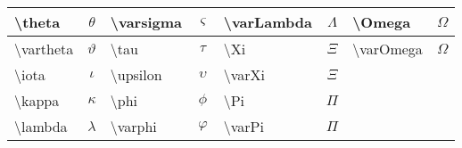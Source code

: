 \begin{center}
\begin{tabular}{|l|c||l|c|l|c||l|c|}
\textbackslash theta        & $\theta$          & \textbackslash varsigma     & $\varsigma$ & \textbackslash varLambda    & $\varLambda$    & \textbackslash Omega        & $\Omega$        \\ \hline
\textbackslash vartheta     & $\vartheta$       & \textbackslash tau          & $\tau$      & \textbackslash Xi           & $\Xi$           & \textbackslash varOmega     & $\varOmega$     \\ \hline
\textbackslash iota         & $\iota$           & \textbackslash upsilon      & $\upsilon$  & \textbackslash varXi        & $\varXi$        &                             &                 \\ \hline
\textbackslash kappa        & $\kappa$          & \textbackslash phi          & $\phi$      & \textbackslash Pi           & $\Pi$           &                             &                 \\ \hline
\textbackslash lambda       & $\lambda$         & \textbackslash varphi       & $\varphi$   & \textbackslash varPi        & $\varPi$        &                             &                 \\ \hline
\end{tabular}
\end{center}



